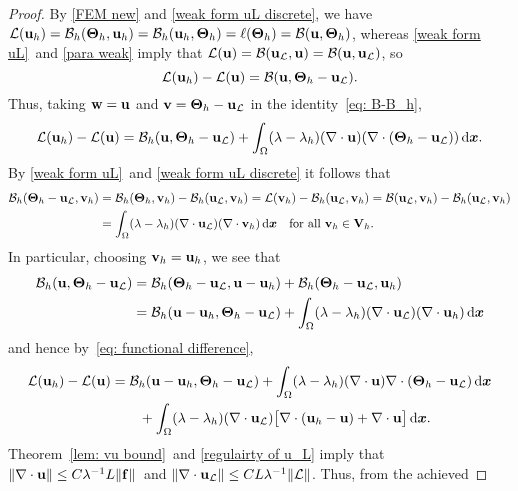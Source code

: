 \documentclass[11pt]{article}
\newcommand{\calB}{\mathcal{B}}
\newcommand{\calL}{\mathcal{L}}
\newcommand{\vf}{{\bf f}}
\newcommand{\vu}{{\bf u}}
\newcommand{\vv}{{\bf v}}
\newcommand{\vV}{{\bf V}}
\newcommand{\vw}{{\bf w}}
\newcommand{\bsx}{{\boldsymbol{x}}}
\numberwithin{equation}{section}
\newcommand{\ud}{\mathrm{d}}
\begin{document}
\begin{proof}
By \eqref{FEM new} and \eqref{weak form uL discrete}, we have
$\calL(\vu_h)=\calB_h(\mathbf{\Theta}_h,\vu_h)
=\calB_h(\vu_h,\mathbf{\Theta}_h)=\ell(\mathbf{\Theta}_h)
=\calB(\vu,\mathbf{\Theta}_h)$, whereas \eqref{weak form uL}~and
\eqref{para weak} imply that
$\calL(\vu)=\calB(\vu_{\calL},\vu)=\calB(\vu,\vu_{\calL})$, so
\[
\calL(\vu_h)-\calL(\vu)=\calB(\vu,\mathbf{\Theta}_h-\vu_{\calL}).
\]
Thus, taking $\vw=\vu$ and $\vv=\mathbf{\Theta}_h-\vu_{\calL}$ in the
identity~\eqref{eq: B-B_h},
\begin{equation}\label{eq: functional difference}
\calL(\vu_h)-\calL(\vu)
    =\calB_h(\vu,\mathbf{\Theta}_h-\vu_{\calL})
    +\int_{\Omega}(\lambda-\lambda_h)(\nabla\cdot\vu)
        (\nabla \cdot(\mathbf{\Theta}_h-\vu_{\calL}))\,\ud\bsx.
\end{equation}
By \eqref{weak form uL}~and \eqref{weak form uL discrete} it follows that
\begin{align*}
\calB_h(\mathbf{\Theta}_h-\vu_{\calL},\vv_h)
    &=\calB_h(\mathbf{\Theta}_h,\vv_h)-\calB_h(\vu_{\calL},\vv_h)
    =\calL(\vv_h)-\calB_h(\vu_{\calL},\vv_h)
    =\calB(\vu_{\calL},\vv_h)-\calB_h(\vu_{\calL},\vv_h)\\
   &=\int_{\Omega}(\lambda-\lambda_h)
    (\nabla\cdot\vu_{\calL})(\nabla\cdot\vv_h)\,\ud\bsx
    \quad\text{for all $\vv_h \in\vV_h$.}
\end{align*}
In particular, choosing $\vv_h=\vu_h$, we see that
\begin{align*}
\calB_h(\vu,\mathbf{\Theta}_h-\vu_{\calL})
    &=\calB_h(\mathbf{\Theta}_h-\vu_{\calL},\vu-\vu_h)
    +\calB_h(\mathbf{\Theta}_h-\vu_{\calL},\vu_h)\\
    &=\calB_h(\vu-\vu_h,\mathbf{\Theta}_h-\vu_{\calL})
    +\int_{\Omega} (\lambda-\lambda_h)
    (\nabla\cdot\vu_{\calL})(\nabla\cdot\vu_h)\,\ud\bsx
\end{align*}
and hence by~\eqref{eq: functional difference},
\begin{align*}
\calL(\vu_h)-\calL(\vu)
    &=\calB_h(\vu-\vu_h,\mathbf{\Theta}_h-\vu_{\calL})
+\int_{\Omega}(\lambda-\lambda_h)
    (\nabla\cdot\vu)\nabla\cdot(\mathbf{\Theta}_h-\vu_{\calL})\,\ud\bsx\\
&\qquad{}+\int_{\Omega}(\lambda-\lambda_h)(\nabla\cdot\vu_{\calL})\bigl[
    \nabla\cdot(\vu_h-\vu)+\nabla\cdot\vu\bigr]\,\ud\bsx.
\end{align*}
Theorem~\ref{lem: vu bound}~and \eqref{regulairty of u_L} imply that
$\|\nabla\cdot\vu\|\le C\lambda^{-1}L\|\vf\|$~and
$\|\nabla\cdot\vu_{\calL}\|\le CL\lambda^{-1}\|\calL\|$. Thus, from the achieved

\end{proof}
\end{document}
